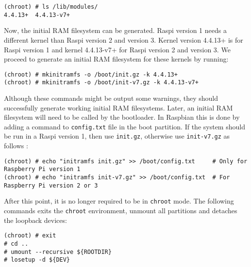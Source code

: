 \begin{lstlisting}[]
(chroot) # ls /lib/modules/
4.4.13+  4.4.13-v7+
\end{lstlisting}
\FloatBarrier
\vspace{-5mm}

Now, the initial \ac{RAM} filesystem can be generated. \ac{Raspi} version 1
needs a different kernel than \ac{Raspi} version 2 and version 3. Kernel
version 4.4.13+ is for \ac{Raspi} version 1 and kernel 4.4.13-v7+ for
\ac{Raspi} version 2 and version 3. We proceed to generate an initial
\ac{RAM} filesystem for these kernels by running:

\begin{lstlisting}[]
(chroot) # mkinitramfs -o /boot/init.gz -k 4.4.13+
(chroot) # mkinitramfs -o /boot/init-v7.gz -k 4.4.13-v7+
\end{lstlisting}
\FloatBarrier
\vspace{-5mm}

Although these commands might be output some warnings, they should
successfully generate working initial \ac{RAM} filesystems. Later, an
initial \ac{RAM} filesystem will need to be called by the bootloader.
In Raspbian this is done by adding a command to \texttt{config.txt} file
in the boot partition. If the system should be run in a \ac{Raspi} version 1,
then use \texttt{init.gz}, otherwise use \texttt{init-v7.gz} as follows
:

\begin{lstlisting}[]
(chroot) # echo "initramfs init.gz" >> /boot/config.txt     # Only for Raspberry Pi version 1
(chroot) # echo "initramfs init-v7.gz" >> /boot/config.txt  # For Raspberry Pi version 2 or 3
\end{lstlisting}
\FloatBarrier
\vspace{-5mm}

After this point, it is no longer required to be in \texttt{chroot} mode.
The following commands exits the \texttt{chroot} environment, unmount all
partitions and detaches the loopback devices:

\begin{lstlisting}[]
(chroot) # exit
# cd ..
# umount --recursive ${ROOTDIR}
# losetup -d ${DEV}
\end{lstlisting}
\FloatBarrier
\vspace{-5mm}

